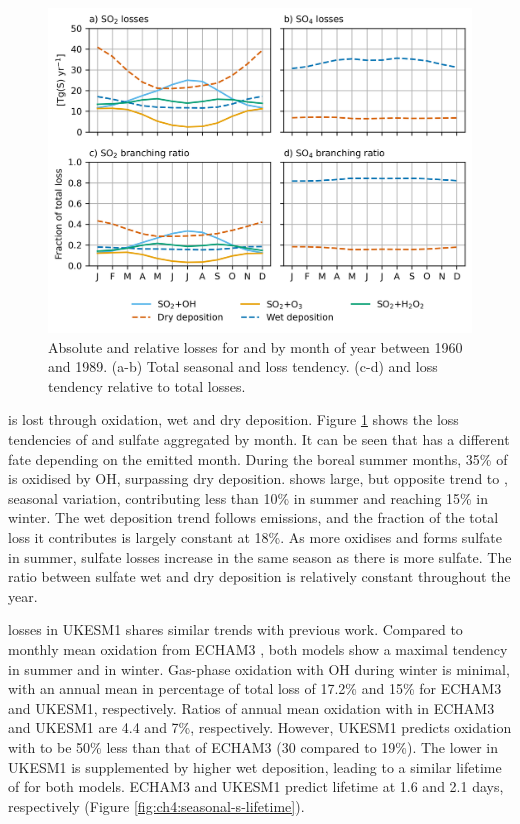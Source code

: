 \begin{figure}
    \centering
    \includegraphics{Chapter4/Figs/branching_ratio_histsst_pothole.png}
    \caption[Absolute and relative losses for  and  by month of year between 1960 and 1989]{Absolute and relative losses for  and  by month of year between 1960 and 1989. (a-b) Total seasonal  and  loss tendency. (c-d)  and  loss tendency relative to total losses.}
    \label{fig:ch4:seasonal-branching-ratio}
\end{figure}

 is lost through oxidation, wet and dry deposition. Figure \ref{fig:ch4:seasonal-branching-ratio} shows the loss tendencies of  and sulfate aggregated by month. It can be seen that  has a different fate depending on the emitted month. During the boreal summer months, 35\% of  is oxidised by OH, surpassing dry deposition.  shows large, but opposite trend to , seasonal variation, contributing less than 10\% in summer and reaching 15\% in winter. The wet deposition trend follows emissions, and the fraction of the total loss it contributes is largely constant at 18\%. As more  oxidises and forms sulfate in summer, sulfate losses increase in the same season as there is more sulfate. The ratio between sulfate wet and dry deposition is relatively constant throughout the year.

 losses in UKESM1 shares similar trends with previous work. Compared to monthly mean  oxidation from ECHAM3 \citep{feichterSimulationTroposphericSulfur1996}, both models show a maximal  tendency in summer and  in winter. Gas-phase oxidation with OH during winter is minimal, with an annual mean in percentage of total loss of 17.2\% and 15\% for ECHAM3 and UKESM1, respectively. Ratios of annual mean  oxidation with  in ECHAM3 and UKESM1 are 4.4 and 7\%, respectively. However, UKESM1 predicts  oxidation with  to be 50\% less than that of ECHAM3 (30 compared to 19\%). The lower  in UKESM1 is supplemented by higher wet deposition, leading to a similar lifetime of  for both models. ECHAM3 and UKESM1 predict  lifetime at 1.6 and 2.1 days, respectively (Figure \ref{fig:ch4:seasonal-s-lifetime}).

